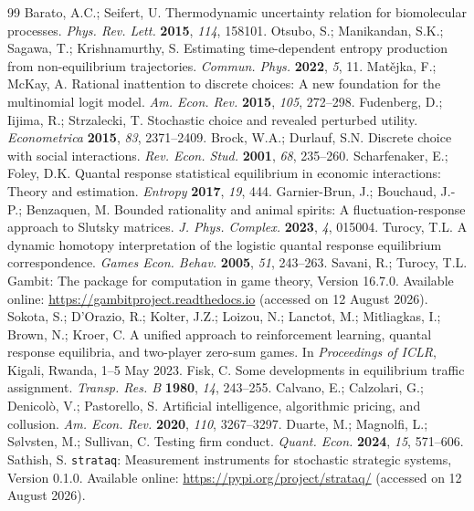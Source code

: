 \documentclass[10pt,a4paper]{article}
\newcommand{\strataq}{\texttt{strataq}}
\begin{document}
\begin{thebibliography}{99}
 Barato, A.C.; Seifert, U. Thermodynamic uncertainty relation for biomolecular processes. \emph{Phys. Rev. Lett.} \textbf{2015}, \emph{114}, 158101.
 Otsubo, S.; Manikandan, S.K.; Sagawa, T.; Krishnamurthy, S. Estimating time-dependent entropy production from non-equilibrium trajectories. \emph{Commun. Phys.} \textbf{2022}, \emph{5}, 11.
 Mat\v{e}jka, F.; McKay, A. Rational inattention to discrete choices: A new foundation for the multinomial logit model. \emph{Am. Econ. Rev.} \textbf{2015}, \emph{105}, 272--298.
 Fudenberg, D.; Iijima, R.; Strzalecki, T. Stochastic choice and revealed perturbed utility. \emph{Econometrica} \textbf{2015}, \emph{83}, 2371--2409.
 Brock, W.A.; Durlauf, S.N. Discrete choice with social interactions. \emph{Rev. Econ. Stud.} \textbf{2001}, \emph{68}, 235--260.
 Scharfenaker, E.; Foley, D.K. Quantal response statistical equilibrium in economic interactions: Theory and estimation. \emph{Entropy} \textbf{2017}, \emph{19}, 444.
 Garnier-Brun, J.; Bouchaud, J.-P.; Benzaquen, M. Bounded rationality and animal spirits: A fluctuation-response approach to Slutsky matrices. \emph{J. Phys. Complex.} \textbf{2023}, \emph{4}, 015004.
 Turocy, T.L. A dynamic homotopy interpretation of the logistic quantal response equilibrium correspondence. \emph{Games Econ. Behav.} \textbf{2005}, \emph{51}, 243--263.
 Savani, R.; Turocy, T.L. Gambit: The package for computation in game theory, Version 16.7.0. Available online: \url{https://gambitproject.readthedocs.io} (accessed on 12 August 2026).
 Sokota, S.; D'Orazio, R.; Kolter, J.Z.; Loizou, N.; Lanctot, M.; Mitliagkas, I.; Brown, N.; Kroer, C. A unified approach to reinforcement learning, quantal response equilibria, and two-player zero-sum games. In \emph{Proceedings of ICLR}, Kigali, Rwanda, 1--5 May 2023.
 Fisk, C. Some developments in equilibrium traffic assignment. \emph{Transp. Res. B} \textbf{1980}, \emph{14}, 243--255.
 Calvano, E.; Calzolari, G.; Denicol\`o, V.; Pastorello, S. Artificial intelligence, algorithmic pricing, and collusion. \emph{Am. Econ. Rev.} \textbf{2020}, \emph{110}, 3267--3297.
 Duarte, M.; Magnolfi, L.; S{\o}lvsten, M.; Sullivan, C. Testing firm conduct. \emph{Quant. Econ.} \textbf{2024}, \emph{15}, 571--606.
 Sathish, S. \strataq: Measurement instruments for stochastic strategic systems, Version 0.1.0. Available online: \url{https://pypi.org/project/strataq/} (accessed on 12 August 2026).
\end{thebibliography}
\end{document}
